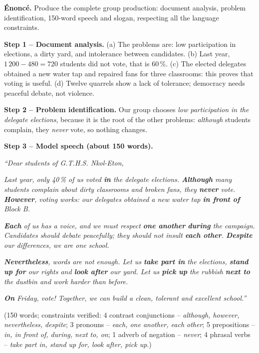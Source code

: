 \documentclass[11pt]{article}
\begin{document}
\begin{exoresolu}
\textbf{Énoncé.} Produce the complete group production: document analysis, problem identification, 150-word speech and slogan, respecting all the language constraints.

\tcblower

\textbf{Step 1 -- Document analysis.} (a) The problems are: low participation in elections, a dirty yard, and intolerance between candidates. (b) Last year, $1\,200 - 480 = 720$ students did not vote, that is 60\,\%. (c) The elected delegates obtained a new water tap and repaired fans for three classrooms: this proves that voting is useful. (d) Twelve quarrels show a lack of tolerance; democracy needs peaceful debate, not violence.

\textbf{Step 2 -- Problem identification.} Our group chooses \emph{low participation in the delegate elections}, because it is the root of the other problems: \emph{although} students complain, they \emph{never} vote, so nothing changes.

\textbf{Step 3 -- Model speech (about 150 words).}

\emph{``Dear students of G.T.H.S. Nkol-Eton,}

\emph{Last year, only 40\,\% of us voted \textbf{in} the delegate elections. \textbf{Although} many students complain about dirty classrooms and broken fans, they \textbf{never} vote. \textbf{However}, voting works: our delegates obtained a new water tap \textbf{in front of} Block B.}

\emph{\textbf{Each} of us has a voice, and we must respect \textbf{one another} \textbf{during} the campaign. Candidates should debate peacefully; they should not insult \textbf{each other}. \textbf{Despite} our differences, we are one school.}

\emph{\textbf{Nevertheless}, words are not enough. Let us \textbf{take part in} the elections, \textbf{stand up for} our rights and \textbf{look after} our yard. Let us \textbf{pick up} the rubbish \textbf{next to} the dustbin and work harder than before.}

\emph{\textbf{On} Friday, vote! Together, we can build a clean, tolerant and excellent school.''}

(150 words; constraints verified: 4 contrast conjunctions -- \emph{although, however, nevertheless, despite}; 3 pronouns -- \emph{each, one another, each other}; 5 prepositions -- \emph{in, in front of, during, next to, on}; 1 adverb of negation -- \emph{never}; 4 phrasal verbs -- \emph{take part in, stand up for, look after, pick up}.)


\end{exoresolu}
\end{document}
